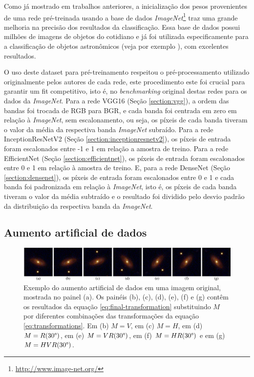 Como já mostrado em trabalhos anteriores, a inicialização dos pesos provenientes de uma rede pré-treinada usando a base de dados \emph{ImageNet}\footnote{\url{http://www.image-net.org/}} traz uma grande melhoria na precisão dos resultados da classificação. Essa base de dados possui milhões de imagens de objetos do cotidiano e já foi utilizada especificamente para a classificação de objetos astronômicos (veja por exemplo \cite{bom2021}), com excelentes resultados.

O uso deste dataset para pré-treinamento respeitou o pré-processamento utilizado originalmente pelos autores de cada rede, este procedimento este foi crucial para garantir um fit competitivo, isto é, no \textit{benchmarking} original destas redes para os dados da \emph{ImageNet}. Para a rede VGG16 (Seção \ref{section:vgg}), a ordem das bandas foi trocada de RGB para BGR, e cada banda foi centrada em zero em relação à \emph{ImageNet}, sem escalonamento, ou seja, os píxeis de cada banda tiveram o valor da média da respectiva banda \emph{ImageNet} subraído. Para a rede InceptionResNetV2 (Seção \ref{section:inceptionresnetv2}), os píxeis de entrada foram escalonados entre -1 e 1 em relação a amostra de treino. Para a rede EfficientNet (Seção \ref{section:efficientnet}), os píxeis de entrada foram escalonados entre 0 e 1 em relação à amostra de treino. E, para a rede DenseNet (Seção \ref{section:densenet}), os píxeis de entrada foram escalonados entre 0 e 1 e cada banda foi padronizada em relação à \emph{ImageNet}, isto é, os píxeis de cada banda tiveram o valor da média subtraído e o resultado foi dividido pelo desvio padrão da distribuição da respectiva banda da \emph{ImageNet}.


\subsection{Aumento artificial de dados}

\begin{figure}[!ht]
  \centering
  \includegraphics[width=\linewidth]{figures/dataaug.pdf}
  \caption{Exemplo do aumento artificial de dados em uma imagem original, mostrada no painel (a). Os painéis (b), (c), (d), (e), (f) e (g) contêm os resultados da equação \eqref{eq:final-transformation} substituindo $M$ por diferentes combinações das transformações da equação \eqref{eq:transformations}. Em (b) $M = V$, em (c) $M = H$, em (d) $M = R(30\degree)$, em (e) $M = V R(30\degree)$, em (f) $M = H R(30\degree)$ e em (g) $M = H V R(30\degree)$.}
  \label{fig:dataaug}
\end{figure}

